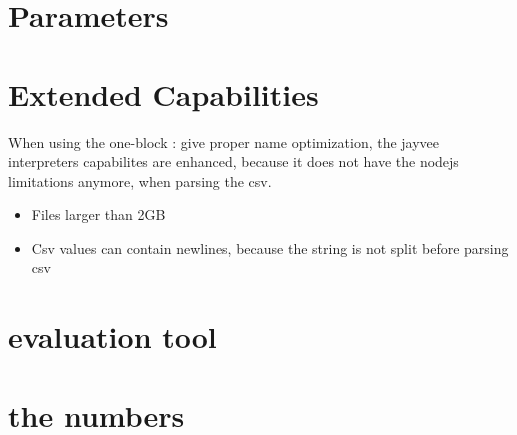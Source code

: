 \section{Parameters}
\label{section:parameters}

\section{Extended Capabilities}
\label{section:jv_limits}

When using the one-block \TODO: give proper name
optimization, the jayvee interpreters capabilites are enhanced, because it does not have the nodejs limitations anymore, when parsing the csv.
\begin{itemize}
	\item Files larger than 2GB
	\item Csv values can contain newlines, because the string is not split before parsing csv
\end{itemize}

\section{evaluation tool}

\section{the numbers}
